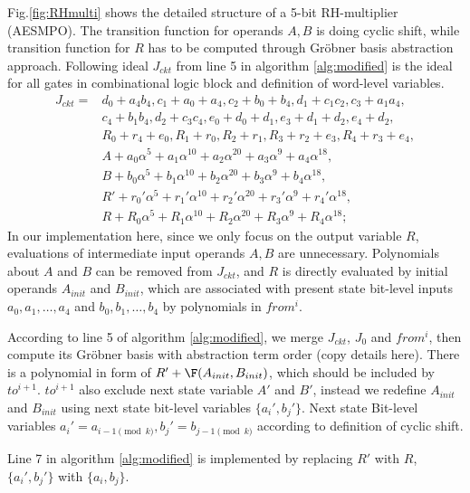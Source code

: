 \begin{Example}
\label{ex:RHSMPO}
Fig.\ref{fig:RHmulti} shows the detailed structure of a 5-bit RH-multiplier (AESMPO). The transition function for
operands $A,B$ is doing cyclic shift, while transition function for $R$ has to be computed through Gr\"obner basis
abstraction approach. Following ideal $J_{ckt}$ from line 5 in algorithm \ref{alg:modified} is the ideal for 
all gates in combinational logic block and definition of word-level variables.
\begin{align}
J_{ckt} = & d_0+a_4b_4, c_1+a_0+a_4, c_2+b_0+b_4, d_1+c_1c_2, c_3+a_1a_4,\nonumber\\
& c_4+b_1b_4, d_2+c_3c_4, e_0+d_0+d_1, e_3+d_1+d_2, e_4+d_2, \nonumber\\
& R_0+r_4+e_0, R_1+r_0, R_2+r_1, R_3+r_2+e_3, R_4+r_3+e_4,\nonumber\\
& A+a_0\alpha^5+a_1\alpha^{10}+a_2\alpha^{20}+a_3\alpha^9+a_4\alpha^{18},\nonumber\\
		 & B+b_0\alpha^5+b_1\alpha^{10}+b_2\alpha^{20}+b_3\alpha^9+b_4\alpha^{18},\nonumber\\
		 & R'+r_0'\alpha^5+r_1'\alpha^{10}+r_2'\alpha^{20}+r_3'\alpha^9+r_4'\alpha^{18},\nonumber\\
		 & R+R_0\alpha^5+R_1\alpha^{10}+R_2\alpha^{20}+R_3\alpha^9+R_4\alpha^{18};\nonumber
\end{align}
In our implementation here, since we only focus on the output variable $R$, evaluations of intermediate input 
operands $A, B$ are unnecessary. Polynomials about $A$ and $B$ can be removed from $J_{ckt}$, and $R$ is directly
evaluated by initial operands $A_{init}$ and $B_{init}$, which are associated with present state bit-level inputs
$a_0,a_1,\dots,a_4$ and $b_0,b_1,\dots,b_4$ by polynomials in $from^i$.

According to line 5 of algorithm \ref{alg:modified}, we merge $J_{ckt}$, $J_0$ and $from^i$, then compute its
Gr\"obner basis with abstraction term order (copy details here). There is a polynomial in form of $R'+\F(A_{init},B_{init})$,
which should be included by $to^{i+1}$. $to^{i+1}$ also exclude next state variable $A'$ and $B'$, instead we 
redefine $A_{init}$ and $B_{init}$ using next state bit-level variables $\{a_i', b_j'\}$. Next state Bit-level variables
$a_i' = a_{i-1\pmod k}, b_j' = b_{j-1\pmod k}$ according to definition of cyclic shift.

Line 7 in algorithm \ref{alg:modified} is implemented by replacing $R'$ with $R$, $\{a_i', b_j'\}$ with $\{a_i,b_j\}$.


\end{Example}
